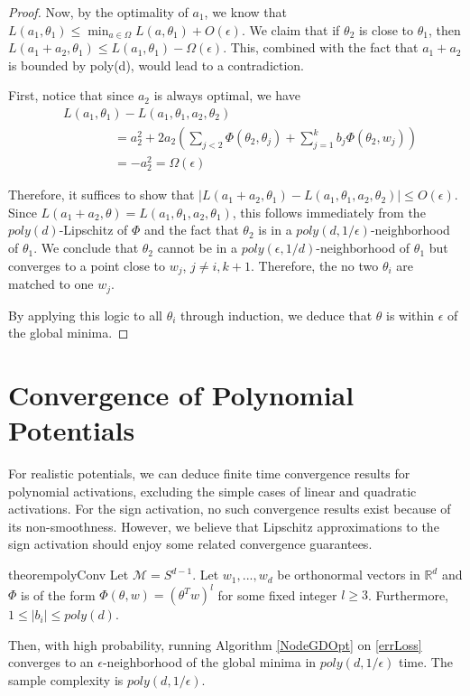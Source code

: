 \documentclass{article}
\newcommand{\R}{{\mathbb{R}}}
\begin{document}
\begin{proof}
Now, by the optimality of $a_1$, we know that $L(a_1,\theta_1) \leq \min_{a \in \Omega} L(a,\theta_1) + O(\epsilon)$. We claim that if $\theta_2$ is close to $\theta_1$, then $L(a_1+a_2,\theta_1) \leq L(a_1,\theta_1) - \Omega(\epsilon)$. This, combined with the fact that $a_1 + a_2$ is bounded by poly(d), would lead to a contradiction.

First, notice that since $a_2$ is always optimal, we have
\begin{align*}
& L(a_1,\theta_1) - L(a_1,\theta_1,a_2,\theta_2) \\
& \qquad \qquad = a_2^2 + 2a_2 (\sum_{j < 2} \Phi(\theta_2,\theta_j) + \sum_{j=1}^k b_j \Phi(\theta_2,w_j)) \\
& \qquad \qquad = -a_2^2 = \Omega(\epsilon)
\end{align*}

Therefore, it suffices to show that $|L(a_1+a_2,\theta_1) - L(a_1,\theta_1,a_2,\theta_2) | \leq O(\epsilon)$. Since $L(a_1+a_2,\theta) = L(a_1,\theta_1,a_2,\theta_1)$, this follows immediately from the $poly(d)$-Lipschitz of $\Phi$ and the fact that $\theta_2$ is in a $poly(d,1/\epsilon)$-neighborhood of $\theta_1$. We conclude that $\theta_2$ cannot be in a $poly(\epsilon,1/d)$-neighborhood of $\theta_1$ but converges to a point close to $w_{j}$, $j\neq i,k+1$. Therefore, the no two $\theta_i$ are matched to one $w_j$. 

By applying this logic to all $\theta_i$ through induction, we deduce that $\theta$ is within $\epsilon$ of the global minima.
\end{proof}


\section{Convergence of Polynomial Potentials}


For realistic potentials, we can deduce finite time convergence results for polynomial activations, excluding the simple cases of linear and quadratic activations. For the sign activation, no such convergence results exist because of its non-smoothness. However, we believe that Lipschitz approximations to the sign activation should enjoy some related convergence guarantees.


\begin{restatable}{theorem}{polyConv}
\label{PolyConv}
Let $\mathcal{M} = S^{d-1}$. Let $w_1,...,w_d$ be orthonormal vectors in $\R^d$ and $\Phi$ is of the form $\Phi(\theta,w) = (\theta^Tw)^l$ for some fixed integer $l \geq 3$. Furthermore, $1 \leq |b_i|\leq poly(d)$. 

Then, with high probability, running Algorithm \ref{NodeGDOpt} on \eqref{errLoss} converges to an $\epsilon$-neighborhood of the global minima in $poly(d,1/\epsilon)$ time. The sample complexity is $poly(d,1/\epsilon)$.
\end{restatable}
\end{document}
